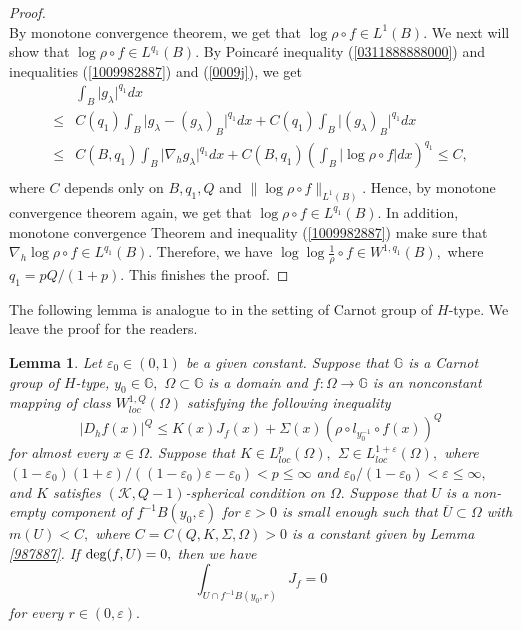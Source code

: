 \documentclass[11pt,twoside]{article}
\newtheorem{lem}[thm]{Lemma}
\theoremstyle{definition}
\theoremstyle{remark}
\begin{document}
\begin{proof}
\begin{equation}
  \end{equation}
By monotone convergence theorem, we get that $\log\rho\circ f\in L^{1}(B).$ We next will show that $\log\rho\circ f\in  L^{q_{1}}(B).$ By Poincar\'{e} inequality   (\ref{0311888888000})  and inequalities (\ref{1009982887}) and (\ref{0009j}), we get 
\begin{equation}
\begin{aligned}
&\int_{B}\vert g_{\lambda}\vert^{q_{1}}dx\\
\leq& C(q_{1})\int_{B}\vert g_{\lambda}-(g_{\lambda})_{B}\vert^{q_{1}}dx+C(q_{1})\int_{B}\vert(g_{\lambda})_{B}\vert^{q_{1}}dx\\
\leq& C(B,q_{1})\int_{B}\vert \nabla_{h}g_{\lambda}\vert^{q_{1}}dx+C(B,q_{1})\left(\int_{B} \vert\log\rho\circ f\vert dx\right)^{q_{1}}\leq C,\\
\end{aligned}
\end{equation}
where $C$ depends only on $B,q_{1},Q $ and $\| \log\rho\circ f\|_{L^{1}(B)}.$ Hence, by  monotone convergence theorem again, we get that $\log\rho\circ f\in L^{q_{1}}(B).$ In addition,  monotone convergence Theorem  and inequality (\ref{1009982887}) make sure that 
$\nabla_{h}\log\rho\circ f\in L^{q_{1}}(B).$ Therefore, we have $\log\log\frac{1}{\rho}\circ f\in W^{1,q_{1}}(B),$ where $q_{1}=pQ/(1+p).$ This finishes the proof. 
\end{proof}



The following lemma is analogue to \cite[Lemma 4.2]{KO221} in the setting of Carnot group of $H$-type. We leave the proof for the readers.
\begin{lem} \label{98788711}
Let $\varepsilon_{0}\in(0,1)$ be a given constant. Suppose that $\mathbb{G}$ is a Carnot group of $H$-type,  $y_{0}\in\mathbb{G},$ $\Omega\subset\mathbb{G}$ is a domain and $f:\Omega\rightarrow \mathbb{G}$ is an nonconstant mapping of class $W_{loc}^{1,Q}(\Omega)$ satisfying  the following inequality
$$\vert D_{h}f(x)\vert^{Q}\leq K(x)J_{f}(x)+\Sigma(x)(\rho\circ l_{y_{0}^{-1}}\circ f(x))^{Q}$$
for almost every $x\in\Omega.$ Suppose that $K\in L_{loc}^{p}(\Omega),$  $\Sigma\in L_{loc}^{1+\varepsilon}(\Omega),$ where $(1-\varepsilon_{0})(1+\varepsilon)/((1-\varepsilon_{0})\varepsilon-\varepsilon_{0})<p\leq\infty$ and $\varepsilon_{0}/(1-\varepsilon_{0})<\varepsilon\leq\infty,$  and $K$ satisfies $(\mathcal{K},Q-1)$-spherical condition on $\Omega.$ Suppose that $U$ is a non-empty component of $f^{-1}B(y_{0},\varepsilon)$ for $\varepsilon>0$ is small enough such that $\overline{U}\subset\Omega$ with $m(U)<C,$ where $C=C(Q,K,\Sigma,\Omega)>0$ is a constant given by Lemma \ref{987887}. If  ${\rm deg}(f,U)=0,$ then we have
\begin{equation}
\int_{U\cap f^{-1}B(y_{0},r)}J_{f}=0
\end{equation}
for every $r\in(0,\varepsilon).$ 
\end{lem}
\end{document}
